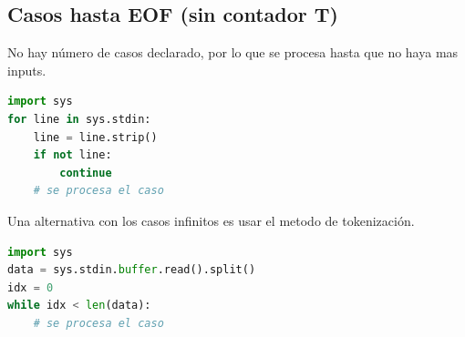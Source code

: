 \subsection{Casos hasta EOF (sin contador T)}
\label{alg:1-4}

No hay número de casos declarado, por lo que se procesa hasta que no haya mas inputs.

\begin{lstlisting}[language=Python]
import sys
for line in sys.stdin:
    line = line.strip()
    if not line:
        continue
    # se procesa el caso
\end{lstlisting}

Una alternativa con los casos infinitos es usar el metodo de tokenización.

\begin{lstlisting}[language=Python]
import sys
data = sys.stdin.buffer.read().split()
idx = 0
while idx < len(data):
    # se procesa el caso
\end{lstlisting}
